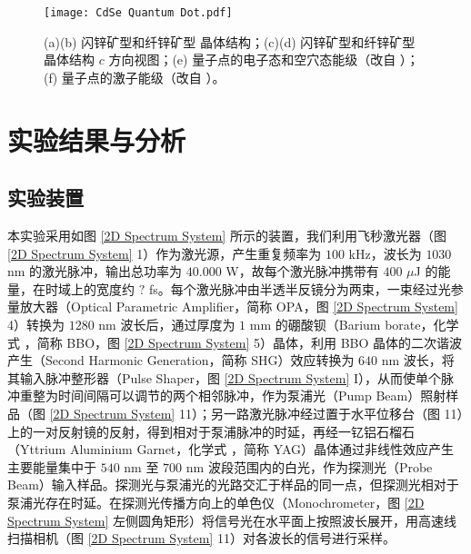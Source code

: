\documentclass{thesis}
\begin{document}
\begin{figure}[h]
    \centering
    \texttt{[image: CdSe Quantum Dot.pdf]}
    \caption{(a)(b) 闪锌矿型和纤锌矿型  晶体结构；(c)(d) 闪锌矿型和纤锌矿型  晶体结构 $c$ 方向视图；(e)  量子点的电子态和空穴态能级（改自 \cite{caram2014persistent}）；(f)  量子点的激子能级（改自 \cite{caram2014persistent}）。}
    \label{CdSe Quantum Dot}
\end{figure}

\chapter{实验结果与分析}
\section{实验装置}
本实验采用如图 \eqref{2D Spectrum System} 所示的装置，我们利用飞秒激光器（图 \ref{2D Spectrum System} \textcircled{\footnotesize{1}}）作为激光源，产生重复频率为 $100$ kHz，波长为 $1030$ nm 的激光脉冲，输出总功率为 $40.000$ W，故每个激光脉冲携带有 $400$ $\mu$J 的能量，在时域上的宽度约 $?$ fs。每个激光脉冲由半透半反镜分为两束，一束经过光参量放大器（Optical Parametric Amplifier，简称 OPA，图 \ref{2D Spectrum System} \textcircled{\footnotesize{4}}）转换为 $1280$ nm 波长后，通过厚度为 $1$ mm 的硼酸钡（Barium borate，化学式 ，简称 BBO，图 \ref{2D Spectrum System} \textcircled{\footnotesize{5}}）晶体，利用 BBO 晶体的二次谐波产生（Second Harmonic Generation，简称 SHG）效应转换为 $640$ nm 波长，将其输入脉冲整形器（Pulse Shaper，图 \ref{2D Spectrum System} I），从而使单个脉冲重整为时间间隔可以调节的两个相邻脉冲，作为泵浦光（Pump Beam）照射样品（图 \ref{2D Spectrum System} \textcircled{\footnotesize{11}}）；另一路激光脉冲经过置于水平位移台（图 \textcircled{\footnotesize{11}}）上的一对反射镜的反射，得到相对于泵浦脉冲的时延，再经一钇铝石榴石（Yttrium Aluminium Garnet，化学式 ，简称 YAG）晶体通过非线性效应产生主要能量集中于 $540$ nm 至 $700$ nm 波段范围内的白光，作为探测光（Probe Beam）输入样品。探测光与泵浦光的光路交汇于样品的同一点，但探测光相对于泵浦光存在时延。在探测光传播方向上的单色仪（Monochrometer，图 \ref{2D Spectrum System} 左侧圆角矩形）将信号光在水平面上按照波长展开，用高速线扫描相机（图 \ref{2D Spectrum System} \textcircled{\footnotesize{11}}）对各波长的信号进行采样。
\end{document}
